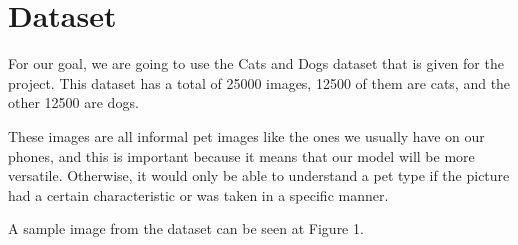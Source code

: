 \section{Dataset}

For our goal, we are going to use the Cats and Dogs dataset that is given for the project. This dataset has a total of 25000 images, 12500 of them are cats, and the other 12500 are dogs. \par

These images are all informal pet images like the ones we usually have on our phones, and this is important because it means that our model will be more versatile. Otherwise, it would only be able to understand a pet type if the picture had a certain characteristic or was taken in a specific manner. \par

A sample image from the dataset can be seen at Figure 1.